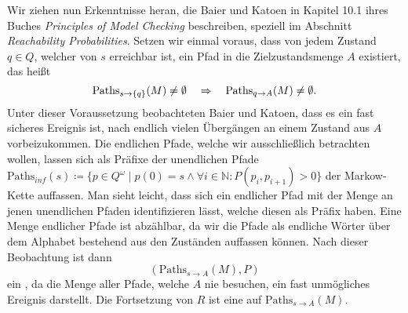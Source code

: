\documentclass[a4paper]{article}
\newcommand{\mc}{Markow-Kette}
\theoremstyle{nonumberplain}
\begin{document}
	Wir ziehen nun Erkenntnisse heran, die Baier und Katoen in Kapitel 10.1 ihres Buches \textit{Principles of Model Checking} \cite{Bai08} beschreiben, speziell im Abschnitt \textit{Reachability Probabilities}.
	Setzen wir einmal voraus, dass von jedem Zustand $q\in Q$, welcher von $s$ erreichbar ist, ein Pfad in die Zielzustandsmenge $A$ existiert, das heißt
	\[
	\mathrm{Paths}_{s \rightarrow \{q\}}(M) \neq \emptyset  \quad \Rightarrow \quad \mathrm{Paths}_{q \rightarrow A}(M) \neq \emptyset \text{.}
	\]
	Unter dieser Voraussetzung beobachteten Baier und Katoen, dass es ein fast sicheres Ereignis ist, nach endlich vielen Übergängen an einem Zustand aus $A$ vorbeizukommen.
	Die endlichen Pfade, welche wir ausschließlich betrachten wollen, lassen sich als Präfixe der unendlichen Pfade $\mathrm{Paths}_{inf}(s) \coloneqq \{p \in Q^\omega \mid p(0) = s \land \forall i \in \mathbb{N}: P(p_i,p_{i+1})>0 \}$ der \mc{} auffassen.
	Man sieht leicht, dass sich ein endlicher Pfad mit der Menge an jenen unendlichen Pfaden identifizieren lässt, welche diesen als  Präfix haben.
	Eine Menge endlicher Pfade ist abzählbar, da wir die Pfade als endliche Wörter über dem Alphabet bestehend aus den Zuständen auffassen können.
	Nach dieser Beobachtung ist dann
	\[
	(\mathrm{Paths}_{s \rightarrow A}(M), P)
	\] ein \probspace{}, da die Menge aller Pfade, welche $A$ nie besuchen, ein fast unmögliches Ereignis darstellt. Die Fortsetzung von $R$ ist eine \rvar{} auf $\mathrm{Paths}_{s \rightarrow A}(M)$. 
\end{document}
